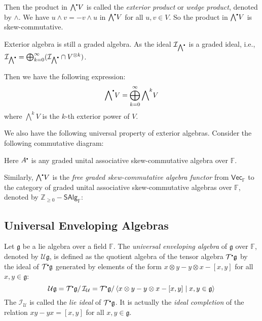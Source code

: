 \documentclass[
	11pt, %
	fleqn, %
	a4paper, %
]{LegrandOrangeBook}
\newcommand{\smallbullet}{\scalebox{0.5}{$\bullet$}}
\renewcommand{\bar}[1]{\overline{#1}} %
\newcommand{\quotient}[2]{#1/\, #2} %
\newcommand{\F}{\mathbb{F}} %
\newcommand{\Vect}{\boldsymbol{\mathsf{Vec}}} %
\newcommand{\T}{\mathcal{T}^{\smallbullet}} %
\newcommand{\Ext}{{\bigwedge}^{\smallbullet}} %
\newcommand{\Env}{\mathcal{U}} %
\newcommand{\ideal}{\mathcal{I}} %
\newcommand{\Z}{\mathbb{Z}} %
\newcommand{\SAlg}{\boldsymbol{\mathsf{SAlg}}} %
\begin{document}
Then the product in $\Ext V$ is called the \emph{exterior product} or \emph{wedge product}, denoted by $\wedge$. We have $u \wedge v = - v \wedge u$ in $\Ext V$ for all $u, v \in V$. So the product in $\Ext V$ is skew-commutative.

\begin{remark}
    Exterior algebra is still a graded algebra. As the ideal $\ideal_{\Ext}$ is a graded ideal, i.e., $\ideal_{\Ext} = \bigoplus_{k = 0}^{\infty} (\ideal_{\Ext} \cap V^{\otimes k})$.
\end{remark}

Then we have the following expression:
\[
    \Ext V = \bigoplus_{k = 0}^{\infty} {\bigwedge}^k V
\]
where ${\bigwedge}^k V$ is the $k$-th exterior power of $V$.

We also have the following universal property of exterior algebras. Consider the following commutative diagram:
\begin{center}
\end{center}
Here $A^{\smallbullet}$ is any graded unital associative skew-commutative algebra over $\F$.

Similarly, $\Ext V$ is the \emph{free graded skew-commutative algebra functor} from $\Vect_{\F}$ to the category of graded unital associative skew-commutative algebras over $\F$, denoted by $\Z_{\geq 0} - \SAlg_{\F}$:

\subsection{Universal Enveloping Algebras}

Let $\mathfrak{g}$ be a lie algebra over a field $\F$. The \emph{universal enveloping algebra} of $\mathfrak{g}$ over $\F$, denoted by $\Env \mathfrak{g}$, is defined as the quotient algebra of the tensor algebra $\T \mathfrak{g}$ by the ideal of $\T \mathfrak{g}$ generated by elements of the form $x \otimes y - y \otimes x - [x, y]$ for all $x, y \in \mathfrak{g}$:
\[
    \Env \mathfrak{g} = \quotient{\T \mathfrak{g}}{\ideal_{\Env}} = \quotient{\T \mathfrak{g}}{\langle x \otimes y - y \otimes x - [x, y] \mid x, y \in \mathfrak{g} \rangle}
\]
The $\ideal_{\Env}$ is called the \emph{lie ideal} of $\T \mathfrak{g}$. It is actually the \emph{ideal completion} of the relation $xy - yx = [x, y]$ for all $x, y \in \mathfrak{g}$.
\end{document}
